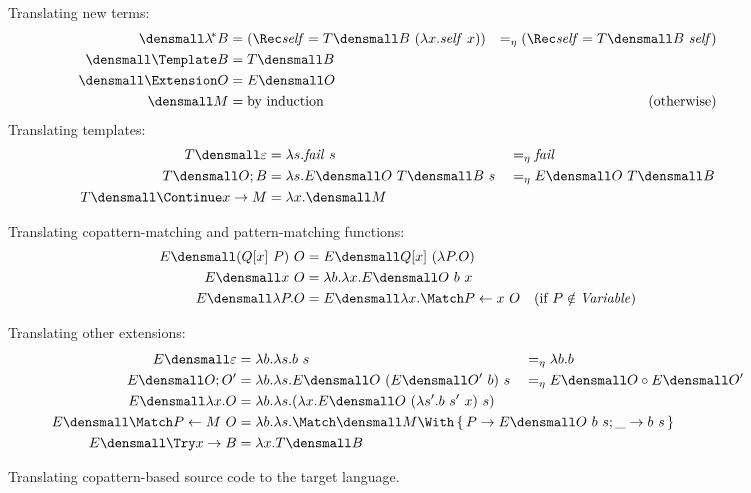 \begin{figure}[t]
\centering
\small
Translating new terms:  
\begin{align*}
  \den{\lamstar B}
  &=
  (\Rec \mathit{self} = T\den{B} ~ (\lambda x. \mathit{self} ~ x))
  &=_\eta
  (\Rec \mathit{self} = T\den{B} ~ \mathit{self})
  \\
  \den{\Template B}
  &=
  T\den{B}
  \\
  \den{\Extension O}
  &=
  E\den{O}
  \\
  \den{M}
  &=
  \text{by induction}
  &(\text{otherwise})
\end{align*}
Translating templates:
\begin{align*}
  T\den{\varepsilon}
  &=
  \lambda s. \mathit{fail}~s
  &
  &=_\eta
  \mathit{fail}
  \\
  T\den{O; B}
  &=
  \lambda s. E\den{O} ~ T\den{B} ~ s
  &
  &=_\eta
  E\den{O} ~ T\den{B}
  \\
  T\den{\Continue x \to M}
  &=
  \lambda x. \den{M}
\end{align*}

Translating copattern-matching and pattern-matching functions:
\begin{align*}
  E\den{(Q[x] ~ P) ~ O}
  &=
  E\den{Q[x] ~ (\lambda P. O)}
  \\
  E\den{x ~ O}
  &=
  \lambda b. \lambda x. E\den{O} ~ b ~ x
  \\
  E\den{\lambda P. O}
  &=
  E\den{\lambda x. \Match P \gets x ~ O}
  &(\text{if } P \notin \mathit{Variable})
\end{align*}

Translating other extensions:
\begin{align*}
  E\den{\varepsilon}
  &=
  \lambda b. \lambda s. b ~ s
  &
  &=_\eta
  \lambda b. b
  \\
  E\den{O; O'}
  &=
  \lambda b. \lambda s. E\den{O} ~ (E\den{O'}~b) ~ s
  &
  &=_\eta
  E\den{O} \comp E\den{O'}
  \\
  E\den{\lambda x. O}
  &=
  \lambda b. \lambda s. (\lambda x. E\den{O} ~ (\lambda s'. b ~ s' ~ x) ~ s)
  \\
  E\den{\Match P \gets M ~ O}
  &=
  \rlap{$
    \lambda b. \lambda s.
    \Match \den{M} \With \set{P \to E\den{O}~b~s; \_ \to b~s}
  $}
  \\
  E\den{\Try x \to B}
  &=
  \lambda x. T\den{B}
\end{align*}
\caption{Translating copattern-based source code to the target language.}
\label{fig:translation}
\end{figure}

